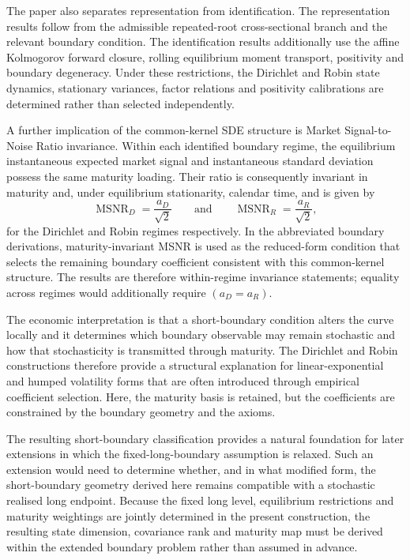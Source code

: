 \documentclass[12pt]{article}
\numberwithin{equation}{subsection}
\newcommand{\MSNR}{\operatorname{MSNR}}
\begin{document}
The paper also separates representation from identification. The representation results follow from the admissible repeated-root cross-sectional branch and the relevant boundary condition. The identification results additionally use the affine Kolmogorov forward closure, rolling equilibrium moment transport, positivity and boundary degeneracy. Under these restrictions, the Dirichlet and Robin state dynamics, stationary variances, factor relations and positivity calibrations are determined rather than selected independently.

A further implication of the common-kernel SDE structure is Market Signal-to-Noise Ratio invariance. Within each identified boundary regime, the equilibrium instantaneous expected market signal and instantaneous standard deviation possess the same maturity loading. Their ratio is consequently invariant in maturity and, under equilibrium stationarity, calendar time, and is given by
\begin{equation}
\MSNR_D=\frac{a_D}{\sqrt{2}}
\qquad\text{and}\qquad
\MSNR_R=\frac{a_R}{\sqrt{2}},
\end{equation}
for the Dirichlet and Robin regimes respectively. In the abbreviated boundary derivations, maturity-invariant MSNR is used as the reduced-form condition that selects the remaining boundary coefficient consistent with this common-kernel structure. The results are therefore within-regime invariance statements; equality across regimes would additionally require $(a_D=a_R)$.


The economic interpretation is that a short-boundary condition alters the curve locally and it determines which boundary observable may remain stochastic and how that stochasticity is transmitted through maturity. The Dirichlet and Robin constructions therefore provide a structural explanation for linear-exponential and humped volatility forms that are often introduced through empirical coefficient selection. Here, the maturity basis is retained, but the coefficients are constrained by the boundary geometry and the axioms.

The resulting short-boundary classification provides a natural foundation for later extensions in which the fixed-long-boundary assumption is relaxed. Such an extension would need to determine whether, and in what modified form, the short-boundary geometry derived here remains compatible with a stochastic realised long endpoint. Because the fixed long level, equilibrium restrictions and maturity weightings are jointly determined in the present construction, the resulting state dimension, covariance rank and maturity map must be derived within the extended boundary problem rather than assumed in advance.
\end{document}
